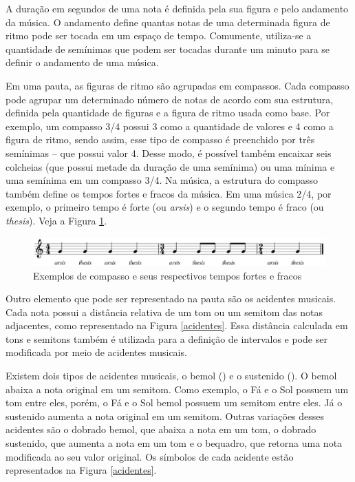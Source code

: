       A duração em segundos de uma nota é definida pela sua figura e pelo andamento da música. O andamento define quantas notas de uma determinada figura de ritmo pode ser tocada em um espaço de tempo. Comumente, utiliza-se a quantidade de semínimas que podem ser tocadas durante um minuto para se definir o andamento de uma música.

      Em uma pauta, as figuras de ritmo são agrupadas em compassos. Cada compasso pode agrupar um determinado número de notas de acordo com sua estrutura, definida pela quantidade de figuras e a figura de ritmo usada como base. Por exemplo, um compasso 3/4 possui 3 como a quantidade de valores e 4 como a figura de ritmo, sendo assim, esse tipo de compasso é preenchido por três semínimas -- que possui valor 4. Desse modo, é possível também encaixar seis colcheias (que possui metade da duração de uma semínima) ou uma mínima e uma semínima em um compasso 3/4. Na música, a estrutura do compasso também define os tempos fortes e fracos da música. Em uma música 2/4, por exemplo, o primeiro tempo é forte (ou \textit{arsis}) e o segundo tempo é fraco (ou \textit{thesis}). Veja a Figura \ref{compassos}.

      \begin{figure}[htb]
        \centering
        \includegraphics[scale=0.6]{figuras/compassos.eps}
        \caption{Exemplos de compasso e seus respectivos tempos fortes e fracos}
        \label{compassos}
      \end{figure}

      Outro elemento que pode ser representado na pauta são os acidentes musicais. Cada nota possui a distância relativa de um tom ou um semitom das notas adjacentes, como representado na Figura \ref{acidentes}. Essa distância calculada em tons e semitons também é utilizada para a definição de intervalos e pode ser modificada por meio de acidentes musicais.

      Existem dois tipos de acidentes musicais, o bemol (\fl) e o sustenido (\sh). O bemol abaixa a nota original em um semitom. Como exemplo, o Fá e o Sol possuem um tom entre eles, porém, o Fá e o Sol bemol possuem um semitom entre eles. Já o sustenido aumenta a nota original em um semitom. Outras variações desses acidentes são o dobrado bemol, que abaixa a nota em um tom, o dobrado sustenido, que aumenta a nota em um tom e o bequadro, que retorna uma nota modificada ao seu valor original. Os símbolos de cada acidente estão representados na Figura \ref{acidentes}.

